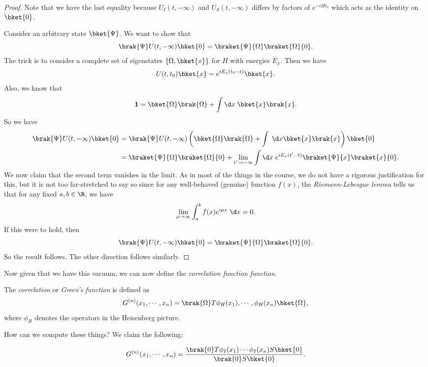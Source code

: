 \documentclass[a4paper]{article}
\begin{document}
\begin{proof}
  Note that we have the last equality because $U_I(t, -\infty)$ and $U_S(t, -\infty)$ differs by factors of $e^{-iH t_0}$ which acts as the identity on $\bket{0}$. %

  Consider an arbitrary state $\bket{\Psi}$. We want to show that
  \[
    \brak{\Psi}U(t, -\infty)\bket{0} = \braket{\Psi}{\Omega}\braket{\Omega}{0}.
  \]
  The trick is to consider a complete set of eigenstates $\{\Omega, \bket{x}\}$ for $H$ with energies $E_x$. Then we have
  \[
    U(t, t_0) \bket{x} = e^{iE_x(t_0 - t)} \bket{x}.
  \]
  Also, we know that
  \[
    \mathbf{1} = \bket{\Omega}\brak{\Omega} + \int \d x\; \bket{x}\brak{x}.
  \]
  So we have
  \begin{align*}
    \brak{\Psi}U(t, -\infty) \bket{0} &= \brak{\Psi}U(t, -\infty) \left(\bket{\Omega}\brak{\Omega} + \int \;\d x \bket{x}\brak{x}\right)\bket{0}\\
    &= \braket{\Psi}{\Omega} \braket{\Omega}{0} + \lim_{t' \to -\infty} \int\d x\; e^{iE_x(t' - t)} \braket{\Psi}{x} \braket{x}{0}.
  \end{align*}
  We now claim that the second term vanishes in the limit. As in most of the things in the course, we do not have a rigorous justification for this, but it is not too far-stretched to say so since for any well-behaved (genuine) function $f(x)$, the \emph{Riemann-Lebesgue lemma} tells us that for any fixed $a, b \in \R$, we have
  \[
    \lim_{\mu \to \infty} \int_a^b f(x) e^{i\mu x}\;\d x = 0.
  \]
  If this were to hold, then
  \[
    \brak{\Psi}U(t, -\infty)\bket{0} = \braket{\Psi}{\Omega}\braket{\Omega}{0}.
  \]
  So the result follows. The other direction follows similarly.
\end{proof}

Now given that we have this vacuum, we can now define the \emph{correlation function function}.
\begin{defi}
  The \emph{correlation} or \emph{Green's function} is defined as
  \[
    G^{(n)}(x_1, \cdots, x_n) = \brak{\Omega}T \phi_H(x_1), \cdots, \phi_H(x_n)\bket{\Omega},
  \]
  where $\phi_H$ denotes the operators in the Heisenberg picture.
\end{defi}

How can we compute these things? We claim the following:
\begin{prop}
  \[
    G^{(n)}(x_1, \cdots, x_n) = \frac{\brak{0}T \phi_I(x_1) \cdots \phi_I(x_n)S \bket{0}}{\brak{0}S\bket{0}}.
  \]
\end{prop}
\end{document}
